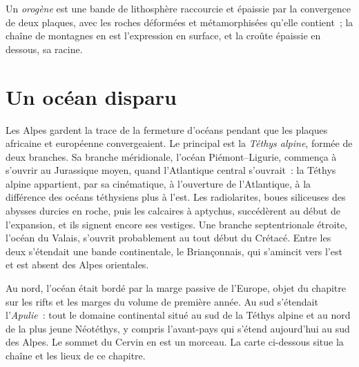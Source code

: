 \begin{definition}[Orogène]\label{def:b2:alpine-orogen:orogen}
Un \emph{orogène} est une bande de lithosphère raccourcie et épaissie par la
convergence de deux plaques, avec les roches déformées et métamorphisées qu'elle contient~; la
chaîne de montagnes en est l'expression en surface, et la croûte épaissie en dessous, sa racine.
\end{definition}

\section{Un océan disparu}\label{sec:b2:alpine-orogen:tethys}

Les Alpes gardent la trace de la fermeture d'océans pendant que les plaques africaine et européenne
convergeaient. Le principal est la \emph{Téthys alpine}, formée de deux branches. Sa
branche méridionale, l'océan Piémont--Ligurie, commença à s'ouvrir au Jurassique moyen, quand
l'Atlantique central s'ouvrait~: la Téthys alpine appartient, par sa cinématique, à l'ouverture de
l'Atlantique, à la différence des océans téthysiens plus à l'est. Les radiolarites, boues siliceuses
des abysses durcies en roche, puis les calcaires à aptychus, succédèrent au début de
l'expansion, et ils signent encore ses vestiges. Une branche septentrionale étroite, l'océan du
Valais, s'ouvrit probablement au tout début du Crétacé. Entre les deux s'étendait une bande continentale, le
Briançonnais, qui s'amincit vers l'est et est absent des Alpes orientales.

Au nord, l'océan était bordé par la marge passive de l'Europe, objet du chapitre sur les rifts et les
marges du volume de première année. Au sud s'étendait l'\emph{Apulie}~: tout le domaine continental situé au sud de la
Téthys alpine et au nord de la plus jeune Néotéthys, y compris l'avant-pays
qui s'étend aujourd'hui au sud des Alpes. Le sommet du Cervin en est un morceau.
La carte ci-dessous situe la chaîne et les lieux de ce chapitre.


